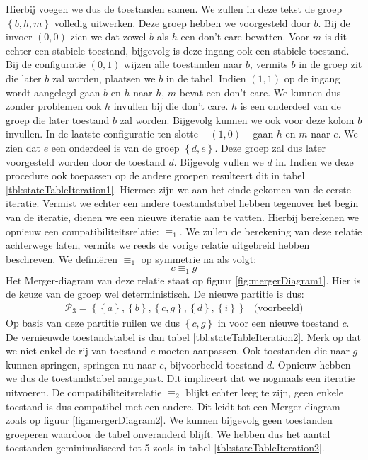 Hierbij voegen we dus de toestanden samen. We zullen in deze tekst de groep $\left\{b,h,m\right\}$ volledig uitwerken. Deze groep hebben we voorgesteld door $b$. Bij de invoer $\left(0,0\right)$ zien we dat zowel $b$ als $h$ een don't care bevatten. Voor $m$ is dit echter een stabiele toestand, bijgevolg is deze ingang ook een stabiele toestand. Bij de configuratie $\left(0,1\right)$ wijzen alle toestanden naar $b$, vermits $b$ in de groep zit die later $b$ zal worden, plaatsen we $b$ in de tabel. Indien $\left(1,1\right)$ op de ingang wordt aangelegd gaan $b$ en $h$ naar $h$, $m$ bevat een don't care. We kunnen dus zonder problemen ook $h$ invullen bij die don't care. $h$ is een onderdeel van de groep die later toestand $b$ zal worden. Bijgevolg kunnen we ook voor deze kolom $b$ invullen. In de laatste configuratie ten slotte -- $\left(1,0\right)$ -- gaan $h$ en $m$ naar $e$. We zien dat $e$ een onderdeel is van de groep $\left\{d,e\right\}$. Deze groep zal dus later voorgesteld worden door de toestand $d$. Bijgevolg vullen we $d$ in. Indien we deze procedure ook toepassen op de andere groepen resulteert dit in tabel \ref{tbl:stateTableIteration1}. Hiermee zijn we aan het einde gekomen van de eerste iteratie. Vermist we echter een andere toestandstabel hebben tegenover het begin van de iteratie, dienen we een nieuwe iteratie aan te vatten. Hierbij berekenen we opnieuw een compatibiliteitsrelatie: $\equiv_1$. We zullen de berekening van deze relatie achterwege laten, vermits we reeds de vorige relatie uitgebreid hebben beschreven. We defini\"eren $\equiv_1$ op symmetrie na als volgt:
\begin{equation}
c\equiv_1g
\end{equation}
Het Merger-diagram van deze relatie staat op figuur \ref{fig:mergerDiagram1}. Hier is de keuze van de groep wel deterministisch. De nieuwe partitie is dus:
\begin{equation}
\begin{array}{lr}
\mathcal{P}_3=\left\{\left\{a\right\},\left\{b\right\},\left\{c,g\right\},\left\{d\right\},\left\{i\right\}\right\}&\mbox{(voorbeeld)}
\end{array}
\end{equation}
Op basis van deze partitie ruilen we dus $\left\{c,g\right\}$ in voor een nieuwe toestand $c$. De vernieuwde toestandstabel is dan tabel \ref{tbl:stateTableIteration2}. Merk op dat we niet enkel de rij van toestand $c$ moeten aanpassen. Ook toestanden die naar $g$ kunnen springen, springen nu naar $c$, bijvoorbeeld toestand $d$. Opnieuw hebben we dus de toestandstabel aangepast. Dit impliceert dat we nogmaals een iteratie uitvoeren. De compatibiliteitsrelatie $\equiv_2$ blijkt echter leeg te zijn, geen enkele toestand is dus compatibel met een andere. Dit leidt tot een Merger-diagram zoals op figuur \ref{fig:mergerDiagram2}. We kunnen bijgevolg geen toestanden groeperen waardoor de tabel onveranderd blijft. We hebben dus het aantal toestanden geminimaliseerd tot 5 zoals in tabel \ref{tbl:stateTableIteration2}.
